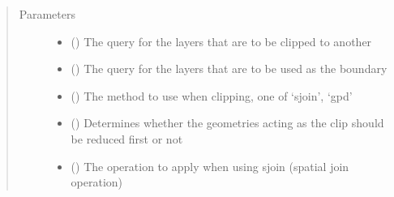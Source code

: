\documentclass[letterpaper,10pt,english]{sphinxmanual}
\begin{document}
\begin{fulllineitems}
\begin{fulllineitems}
\begin{enumerate}
\begin{description}
\end{description}

\end{enumerate}
\begin{quote}\begin{description}
\item[{Parameters}] \leavevmode\begin{itemize}
\item {} 
\sphinxAtStartPar
{} () \textendash{} The query for the layers that are to be clipped to another

\item {} 
\sphinxAtStartPar
{} () \textendash{} The query for the layers that are to be used as the boundary

\item {} 
\sphinxAtStartPar
{} () \textendash{} The method to use when clipping, one of ‘sjoin’, ‘gpd’

\item {} 
\sphinxAtStartPar
{} () \textendash{} Determines whether the geometries acting as the clip should be reduced first or not

\item {} 
\sphinxAtStartPar
{} () \textendash{} The operation to apply when using sjoin (spatial join operation)

\end{itemize}

\end{description}\end{quote}

\end{fulllineitems}



\end{fulllineitems}
\end{document}
